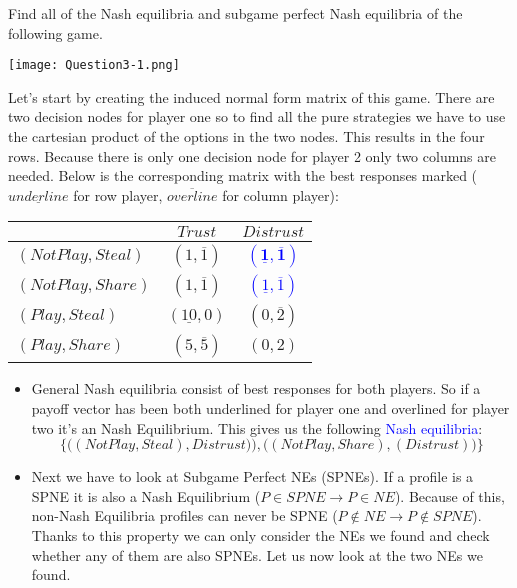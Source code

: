 \documentclass[../main.tex]{subfiles}
\begin{document}
\begin{question}
    Find all of the Nash equilibria and subgame perfect Nash equilibria of the following game.

    \centering
    \texttt{[image: Question3-1.png]}
\end{question}

\begin{solution} 
Let's start by creating the induced normal form matrix of this game. 
There are two decision nodes for player one so to find all the pure strategies we have to use the cartesian product of the options in the two nodes. This results in the four rows.
Because there is only one decision node for player 2 only two columns are needed.
Below is the corresponding matrix with the best responses marked ($\underline{underline}$ for row player, $\overline{overline}$ for column player): 
\begin{center}
	\setlength\extrarowheight{1pt} %
	\begin{tabular}{|l|c|c|}
		\hline
		& $Trust$ & $Distrust$ \\
		\hline
		$(Not Play,Steal)$ & $(1,\overline{1})$ & \textcolor{blue}{$\mathbf{(\underline{1},\overline{1})}$} \\
		\hline
		$(Not Play,Share)$ & $(1,\overline{1})$ & \textcolor{blue}{$(\underline{1},\overline{1})$} \\
		\hline
		$(Play,Steal)$ & $(\underline{10},0)$ & $(0,\overline{2})$ \\
		\hline
		$(Play,Share)$ & $(5,\overline{5})$ & $(0,2)$ \\
		\hline
	\end{tabular}
\end{center}
\begin{itemize}
	\item General Nash equilibria consist of best responses for both players. So if a payoff vector has been both underlined for player one and overlined for player two it's an Nash Equilibrium. This gives us the following \textcolor{blue}{Nash equilibria}: 
	$$\{\Big((Not Play, Steal),Distrust)\Big),\Big((Not Play, Share),(Distrust)\Big)\}$$
	\item Next we have to look at Subgame Perfect NEs (SPNEs).
		If a profile is a SPNE it is also a Nash Equilibrium ($P \in SPNE \rightarrow P \in NE$).
		Because of this, non-Nash Equilibria profiles can never be SPNE ($P \notin NE \rightarrow P \notin SPNE$). Thanks to this property we can only consider the NEs we found and check whether any of them are also SPNEs.
		Let us now look at the two NEs we found.


\end{itemize}
\end{solution}
\end{document}
